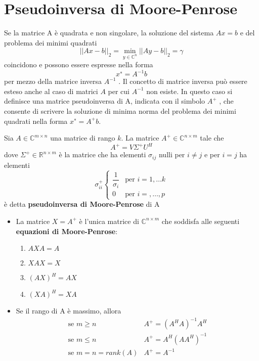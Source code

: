 \section{Pseudoinversa di Moore-Penrose}
Se la matrice A \`e quadrata e non singolare, la soluzione del
	 sistema $Ax = b$ e del problema dei minimi quadrati
$$|| Ax − b ||_{2} = \displaystyle \min_{y \in
\mathbb{C}^{n}} || Ay − b||_{2} = \gamma$$ coincidono 
e possono essere espresse nella forma
$$x^∗ = A^{−1} b$$
per mezzo della matrice inversa $A^{−1}$ . Il concetto di matrice
 inversa pu\`o essere esteso anche al caso di matrici $A$ per cui
 $A^{-1}$ non esiste. In questo caso si definisce una matrice
 pseudoinversa di A, indicata con il simbolo
$A^{+}$ , che consente di scrivere la soluzione di minima norma 
del problema dei minimi quadrati nella forma
$x^{∗} = A^+ b$.

\begin{defn}
  Sia $A \in \mathbb{C}^{m \times n}$ una matrice di rango $k$. La matrice
$A^{+} \in  \mathbb{C}^{n \times m}$ tale che
$$A^{+} = V \Sigma^{+} U^H$$
dove $\Sigma^+ \in \mathbb{R}^{n \times m}$ \`e  la matrice che ha 
elementi $\sigma_{ij}$ nulli per $i \neq j $ e per $i = j$
ha elementi
$$
\sigma_{ii}^{+}
\left\{
\begin{array}{lc}
\dfrac{1}{\sigma_i} & \text{per } i=1,\ldots k \\
0  & \text{per } i=,\ldots, p
\end{array}
\right.
$$
\`e detta \textbf{pseudoinversa di Moore-Penrose} di A
\end{defn}
\begin{property}
  \begin{itemize}
  \item 
 La matrice $X = A^+$ \`e  l'unica matrice di 
$\mathbb{C}^{n \times m}$ che soddisfa alle seguenti
\textbf{equazioni di Moore-Penrose}:
\begin{enumerate}
\item  $AXA = A$
\item $XAX = X$
\item $(AX)^H = AX$
\item $(XA)^H = XA$
\end{enumerate}


\item Se il rango di A \`e massimo, allora
$$
\begin{array}{ll}
 \text{se } m \geq n & A^{+} = (A^{H}A)^{-1}A^{H} \\ 
 \text{se } m \leq n &  A^{+} =  A^{H}(AA^{H})^{-1} \\ 
 \text{se } m =n = rank(A) & A^{+} =A^{-1}
\end{array}
$$
  \end{itemize}

\end{property}

